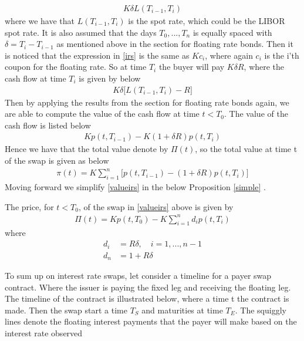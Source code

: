 \begin{align}
    K \delta L(T_{i-1},T_i)
    \label{irs}
\end{align}
where we have that $L(T_{i-1},T_i)$ is the spot rate, which could be the LIBOR spot rate.
It is also assumed
that the days $T_0,...,T_n$ is equally spaced with $\delta = T_i - T_{i-1}$ as mentioned above in the section for floating rate bonds. 
Then it is noticed that the expression in \autoref{irs} is the same as $Kc_i$, where again $c_i$ is the i'th coupon for the floating rate. 
So at time $T_i$ the buyer will pay $K \delta R$, where the cash flow at time $T_i$ is given by below
\begin{align*}
    K \delta \Big[L(T_{i-1},T_i)-R \Big]
\end{align*}
Then by applying the results from the section for floating rate bonds again, we are able to compute the value of the 
cash flow at time $t<T_0$. The value of the cash flow is listed below
\begin{align*}
    K p(t,T_{i-1})-K(1+\delta R)p(t,T_i)
\end{align*}
Hence we have that the total value denote by $\Pi(t)$, so the total value at time t of the swap is given as below
\begin{align}
    \pi (t) = K \sum_{i=1}^{n} \Big[p(t,T_{i-1})-(1+ \delta R)p(t,T_i)\Big]
    \label{valueirs}
\end{align}
Moving forward we simplify \autoref{valueirs} in the below Proposition \ref{simple} \cite{Bjork}.
\begin{proposition}
    The price, for $t<T_0$, of the swap in \autoref{valueirs} above
    is given by 
    \begin{align*}
        \Pi(t) = K p(t,T_0)-K \sum_{i=1}^{n}d_i p(t,T_i)
    \end{align*}
    where
    \begin{align*}
        d_i &= R \delta, \quad i=1,...,n-1 \\
        d_n &= 1+ R \delta
    \end{align*}
    \label{simple}
\end{proposition}
\noindent 
To sum up on interest rate swaps, let consider a timeline for a payer swap contract. Where the issuer is paying the fixed leg 
and receiving the floating leg. The timeline of the contract is illustrated below, where a time t the contract is made. 
Then the swap start a time $T_S$ and maturities at time $T_E$.
The squiggly lines denote the floating interest payments that the payer will make based on the interest rate observed 
